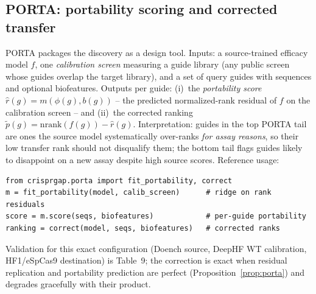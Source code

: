 \documentclass[12pt]{article}
\begin{document}
\subsection{PORTA: portability scoring and corrected transfer}
\label{sec:porta-tool}
PORTA packages the discovery as a design tool. Inputs: a source-trained
efficacy model $f$, one \emph{calibration screen} measuring a guide library
(any public screen whose guides overlap the target library), and a set of
query guides with sequences and optional biofeatures. Outputs per guide:
(i)~the \emph{portability score} $\hat r(g) = m(\phi(g), b(g))$ -- the
predicted normalized-rank residual of $f$ on the calibration screen --
and (ii)~the corrected ranking $\tilde p(g) = \mathrm{nrank}(f(g)) -
\hat r(g)$. Interpretation: guides in the top PORTA tail are ones the
source model systematically over-ranks \emph{for assay reasons}, so their
low transfer rank should not disqualify them; the bottom tail flags
guides likely to disappoint on a new assay despite high source scores.
Reference usage:
\begin{verbatim}
from crisprgap.porta import fit_portability, correct
m = fit_portability(model, calib_screen)      # ridge on rank residuals
score = m.score(seqs, biofeatures)            # per-guide portability
ranking = correct(model, seqs, biofeatures)   # corrected ranks
\end{verbatim}
Validation for this exact configuration (Doench source, DeepHF WT
calibration, HF1/eSpCas9 destination) is Table~9; the correction is
exact when residual replication and portability prediction are perfect
(Proposition~\ref{prop:porta}) and degrades gracefully with their
product.



\end{document}
